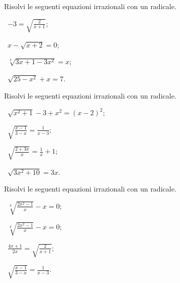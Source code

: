 \begin{esercizio}[\Ast]
 \label{ese:8.4}
Risolvi le seguenti equazioni irrazionali con un radicale.
\begin{multicols}{2}
 \begin{enumeratea}
 \item~$-3=\sqrt{\frac 2{x+1}}$;
 \item~$x-\sqrt{x+2}=0$;
 \item~$\sqrt[3]{3x+1-3x^2}=x$;
 \item~$\sqrt{25-x^2}+x=7$.
 \end{enumeratea}
 \end{multicols}
\end{esercizio}

\begin{esercizio}[\Ast]
 \label{ese:8.5}
Risolvi le seguenti equazioni irrazionali con un radicale.
\begin{multicols}{2}
 \begin{enumeratea}
 \item~$\sqrt{x^2+1}-3+x^2=(x-2)^2$;
 \item~$\sqrt{\frac{x-1}{3-x}}=\frac 1{x-3}$;
 \item~$\sqrt{\frac{2+3x} x}=\frac 1 x+1$;
 \item~$\sqrt{3x^2+10}=3x$.
 \end{enumeratea}
 \end{multicols}
\end{esercizio}

\begin{esercizio}[\Ast]
 \label{ese:8.6}
Risolvi le seguenti equazioni irrazionali con un radicale.
\begin{multicols}{2}
 \begin{enumeratea}
 \item~$\sqrt[3]{\frac{2x^2-1} x}-x=0$;
 \item~$\sqrt[2]{\frac{2x^2-1} x}-x=0$;
 \item~$\frac{4x+1}{2x}=\sqrt{\frac 2{x+1}}$;
 \item~$\sqrt{\frac{x-1}{3-x}}=\frac 1{x-3}$.
 \end{enumeratea}
 \end{multicols}
\end{esercizio}

